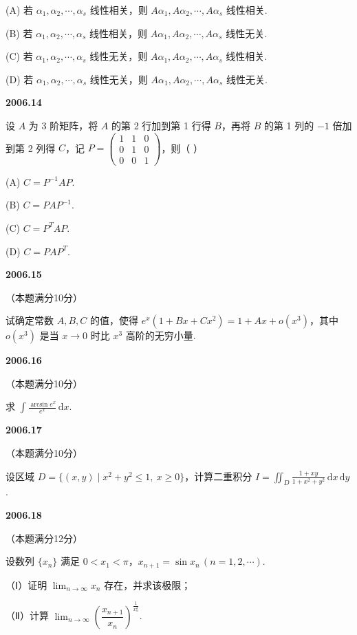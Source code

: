 \documentclass[UTF8,12pt,fontset=windows]{ctexart}
\begin{document}
(A) 若 $\alpha_1,\alpha_2,\cdots,\alpha_s$ 线性相关，则 $A\alpha_1,A\alpha_2,\cdots,A\alpha_s$ 线性相关.

(B) 若 $\alpha_1,\alpha_2,\cdots,\alpha_s$ 线性相关，则 $A\alpha_1,A\alpha_2,\cdots,A\alpha_s$ 线性无关.

(C) 若 $\alpha_1,\alpha_2,\cdots,\alpha_s$ 线性无关，则 $A\alpha_1,A\alpha_2,\cdots,A\alpha_s$ 线性相关.

(D) 若 $\alpha_1,\alpha_2,\cdots,\alpha_s$ 线性无关，则 $A\alpha_1,A\alpha_2,\cdots,A\alpha_s$ 线性无关.

\vfill
\newpage
{\large\bfseries 2006.14}

设 $A$ 为 3 阶矩阵，将 $A$ 的第 2 行加到第 1 行得 $B$，再将 $B$ 的第 1 列的 $-1$ 倍加到第 2 列得 $C$，记 $P = \begin{pmatrix} 1 & 1 & 0 \\ 0 & 1 & 0 \\ 0 & 0 & 1 \end{pmatrix}$，则（ ）

(A) $C = P^{-1}AP$.

(B) $C = PAP^{-1}$.

(C) $C = P^TAP$.

(D) $C = PAP^T$.

\vfill
\newpage
{\large\bfseries 2006.15}

（本题满分10分）

试确定常数 $A,B,C$ 的值，使得 $e^x(1+Bx+Cx^2) = 1+Ax+o(x^3)$，其中 $o(x^3)$ 是当 $x \to 0$ 时比 $x^3$ 高阶的无穷小量.

\vfill
\newpage
{\large\bfseries 2006.16}

（本题满分10分）

求 $\displaystyle\int \frac{\arcsin e^x}{e^x}\,\mathrm{d}x$.

\vfill
\newpage
{\large\bfseries 2006.17}

（本题满分10分）

设区域 $D = \{(x,y) \mid x^2+y^2 \leqslant 1,\ x \geqslant 0\}$，计算二重积分 $I = \displaystyle\iint_D \frac{1+xy}{1+x^2+y^2}\,\mathrm{d}x\,\mathrm{d}y$.

\vfill
\newpage
{\large\bfseries 2006.18}

（本题满分12分）

设数列 $\{x_n\}$ 满足 $0 < x_1 < \pi$，$x_{n+1} = \sin x_n\,(n = 1,2,\cdots)$.

（Ⅰ）证明 $\lim_{n \to \infty}x_n$ 存在，并求该极限；

（Ⅱ）计算 $\lim_{n \to \infty}\left(\dfrac{x_{n+1}}{x_n}\right)^{\frac{1}{x_n^2}}$.
\end{document}
